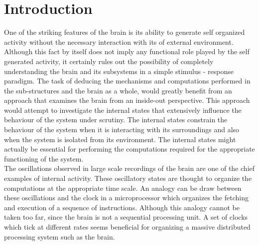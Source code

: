 \chapter{Introduction} 

\label{intro}

One  of the striking features of the brain is its ability to generate self organized activity without the necessary interaction with its of external environment. Although this fact by itself does not imply any functional role played by the self generated activity, it certainly rules out the possibility of completely understanding the brain and its subsystems in a simple stimulus - response paradigm. The task of deducing the mechanisms and computations performed in the sub-structures and  the brain as a whole, would greatly benefit from an approach that examines the brain from an inside-out perspective. This approach would attempt to investigate the internal states that extensively influence the behaviour of the system under scrutiny. The internal states constrain the behaviour of the system when it is interacting with its surroundings and also when the system is isolated from its environment. The internal states might actually be essential for performing the computations required for the appropriate functioning of the system. \\

The oscillations observed in large scale recordings of the brain are one of the chief examples of internal  activity. These oscillatory states are thought to organize the computations at the appropriate time scale. An analogy can be draw between these oscillations and the clock in a microprocessor which organizes the fetching and execution of a sequence of instructions. Although this analogy cannot be taken too far, since the brain is not a sequential processing unit. A set of clocks which tick at different rates seems beneficial for organizing a massive distributed processing system such as the brain. \\

